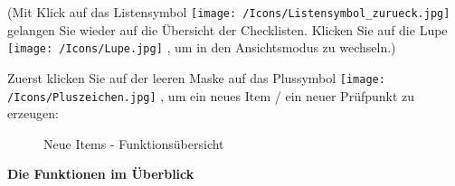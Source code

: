 (Mit Klick auf das Listensymbol \texttt{[image: /Icons/Listensymbol\_zurueck.jpg]}  gelangen Sie wieder auf die Übersicht der Checklisten. Klicken Sie auf die Lupe \texttt{[image: /Icons/Lupe.jpg]} , um in den Ansichtsmodus zu wechseln.)

\vspace{\baselineskip}

Zuerst klicken Sie auf der leeren Maske auf das Plussymbol \texttt{[image: /Icons/Pluszeichen.jpg]} , um ein neues Item / ein neuer Prüfpunkt zu erzeugen:

\pagebreak

\begin{figure}[H]
\caption{Neue Items - Funktionsübersicht}
\end{figure}

\textbf{Die Funktionen im Überblick}

\vspace{\baselineskip}

